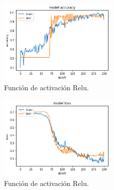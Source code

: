 \begin{figure}
    \centering
    \includegraphics[width=0.5\textwidth]{images/chapter2/batch_256_200_epoch.png}
    \caption{Función de activación Relu.}
    \label{fig:Resultados de la precisión de entrenamiento con un batch-size de 256 y 200 epochs}
\end{figure}

\begin{figure}
    \centering
    \includegraphics[width=0.5\textwidth]{images/chapter2/batch_256_200_epoch_loss.png}
    \caption{Función de activación Relu.}
    \label{fig:Resultados de loss en el entrenamiento con un batch-size de 256 y 200 epochs, }
\end{figure}


\fi


